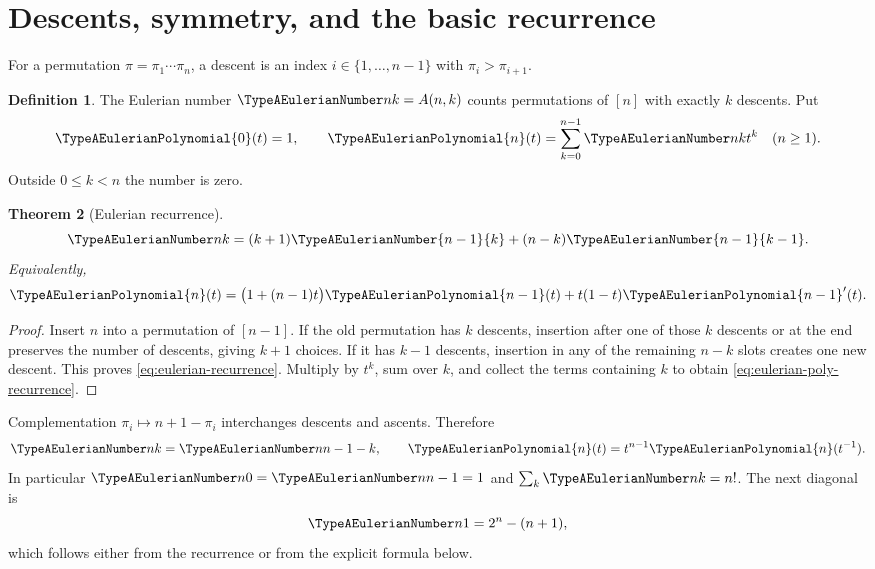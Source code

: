 \documentclass[11pt,a4paper,oneside,openany]{book}
\newtheorem{theorem}{Theorem}[chapter]
\theoremstyle{definition}
\newtheorem{definition}[theorem]{Definition}
\theoremstyle{remark}
\begin{document}
\section{Descents, symmetry, and the basic recurrence}
For a permutation $\pi=\pi_1\cdots\pi_n$, a descent is an index
$i\in\{1,\ldots,n-1\}$ with $\pi_i>\pi_{i+1}$.
\begin{definition}
The Eulerian number $\TypeAEulerianNumber nk=A(n,k)$ counts permutations of $[n]$ with
exactly $k$ descents.  Put
\[
 \TypeAEulerianPolynomial{0}(t)=1,
 \qquad
 \TypeAEulerianPolynomial{n}(t)=\sum_{k=0}^{n-1}\TypeAEulerianNumber nk t^k\quad(n\ge1).
\]
Outside $0\le k<n$ the number is zero.
\end{definition}

\begin{theorem}[Eulerian recurrence]\label{thm:eulerian-recurrence}
\begin{equation}\label{eq:eulerian-recurrence}
 \TypeAEulerianNumber nk=(k+1)\TypeAEulerianNumber{n-1}{k}
 +(n-k)\TypeAEulerianNumber{n-1}{k-1}.
\end{equation}
Equivalently,
\begin{equation}\label{eq:eulerian-poly-recurrence}
 \TypeAEulerianPolynomial{n}(t)=\bigl(1+(n-1)t\bigr)\TypeAEulerianPolynomial{n-1}(t)
       +t(1-t)\TypeAEulerianPolynomial{n-1}'(t).
\end{equation}
\end{theorem}
\begin{proof}
Insert $n$ into a permutation of $[n-1]$.  If the old permutation has $k$
descents, insertion after one of those $k$ descents or at the end preserves the
number of descents, giving $k+1$ choices.  If it has $k-1$ descents, insertion in
any of the remaining $n-k$ slots creates one new descent.  This proves
\eqref{eq:eulerian-recurrence}.  Multiply by $t^k$, sum over $k$, and collect the
terms containing $k$ to obtain \eqref{eq:eulerian-poly-recurrence}.
\end{proof}

Complementation $\pi_i\mapsto n+1-\pi_i$ interchanges descents and ascents.
Therefore
\begin{equation}\label{eq:eulerian-symmetry}
 \TypeAEulerianNumber nk=\TypeAEulerianNumber n{n-1-k},
 \qquad
 \TypeAEulerianPolynomial{n}(t)=t^{n-1}\TypeAEulerianPolynomial{n}(t^{-1}).
\end{equation}
In particular $\TypeAEulerianNumber n0=\TypeAEulerianNumber n{n-1}=1$ and
$\sum_k\TypeAEulerianNumber nk=n!$.  The next diagonal is
\begin{equation}\label{eq:eulerian-k1}
 \TypeAEulerianNumber n1=2^n-(n+1),
\end{equation}
which follows either from the recurrence or from the explicit formula below.
\end{document}
